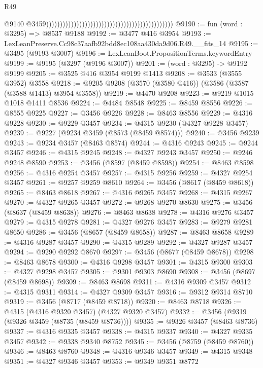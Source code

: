 \begin{lexlean}{R49}
\begin{coremodule}
                                                                                                @9140
                                                                                                @3459))))))))))))))))))))))))))))))))))))))))))))))
@9190 := fun (word : @3295) => @8537 @9188
@9192 := @3477 @416 @3954
@9193 := LexLeanPreserve.Cc98c37aafb92bdd8ec108aa430da9d06.R49.__fits_14
@9195 := @3495 (@9193 @3007)
@9196 := LexLeanBoot.PropositionTerms.keywordEntry
@9199 := @9195 (@3297 (@9196 @3007))
@9201 := (word : @3295) -> @9192 @9199
@9205 := @3525 @416 @3954 @9199 @1413
@9208 := @3533 (@3555 @3952) @3558
@9218 := @9205 @9208 (@3570 (@3580 @416)) (@3586 (@3587 (@3588 @1413) @3954 @3558))
@9219 := @4470 @9208
@9223 := @9219 @1015 @1018 @1411 @8536
@9224 := @4484 @8548
@9225 := @8459 @8556
@9226 := @8555 @9225
@9227 := @3456 @9226
@9228 := @8463 @8556
@9229 := @4316 @9228
@9230 := @9229 @3457
@9234 := @4315 @9230 (@4327 @9228 @3457)
@9239 := @9227 (@9234 @3459 (@8573 (@8459 @8574)))
@9240 := @3456 @9239
@9243 := @9234 @3457 (@8463 @8574)
@9244 := @4316 @9243
@9245 := @9244 @3457
@9246 := @4315 @9245
@9248 := @4327 @9243 @3457
@9250 := @9246 @9248 @8590
@9253 := @3456 (@8597 (@8459 @8598))
@9254 := @8463 @8598
@9256 := @4316 @9254 @3457
@9257 := @4315 @9256
@9259 := @4327 @9254 @3457
@9261 := @9257 @9259 @8610
@9264 := @3456 (@8617 (@8459 @8618))
@9265 := @8463 @8618
@9267 := @4316 @9265 @3457
@9268 := @4315 @9267
@9270 := @4327 @9265 @3457
@9272 := @9268 @9270 @8630
@9275 := @3456 (@8637 (@8459 @8638))
@9276 := @8463 @8638
@9278 := @4316 @9276 @3457
@9279 := @4315 @9278
@9281 := @4327 @9276 @3457
@9283 := @9279 @9281 @8650
@9286 := @3456 (@8657 (@8459 @8658))
@9287 := @8463 @8658
@9289 := @4316 @9287 @3457
@9290 := @4315 @9289
@9292 := @4327 @9287 @3457
@9294 := @9290 @9292 @8670
@9297 := @3456 (@8677 (@8459 @8678))
@9298 := @8463 @8678
@9300 := @4316 @9298 @3457
@9301 := @4315 @9300
@9303 := @4327 @9298 @3457
@9305 := @9301 @9303 @8690
@9308 := @3456 (@8697 (@8459 @8698))
@9309 := @8463 @8698
@9311 := @4316 @9309 @3457
@9312 := @4315 @9311
@9314 := @4327 @9309 @3457
@9316 := @9312 @9314 @8710
@9319 := @3456 (@8717 (@8459 @8718))
@9320 := @8463 @8718
@9326 := @4315 (@4316 @9320 @3457) (@4327 @9320 @3457)
@9332 := @3456 (@9319 (@9326 @3459 (@8735 (@8459 @8736))))
@9335 := @9326 @3457 (@8463 @8736)
@9337 := @4316 @9335 @3457
@9338 := @4315 @9337
@9340 := @4327 @9335 @3457
@9342 := @9338 @9340 @8752
@9345 := @3456 (@8759 (@8459 @8760))
@9346 := @8463 @8760
@9348 := @4316 @9346 @3457
@9349 := @4315 @9348
@9351 := @4327 @9346 @3457
@9353 := @9349 @9351 @8772

\end{coremodule}
\end{lexlean}

